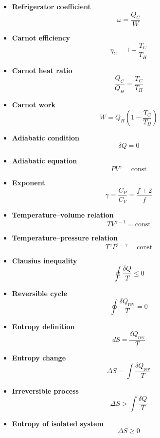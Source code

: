 \documentclass[9pt,twocoloumn]{article}
\begin{document}
\begin{itemize}
\item \textbf{Refrigerator coefficient}
\[
\omega = \frac{Q_C}{W}
\]

\item \textbf{Carnot efficiency}
\[
\eta_C = 1 - \frac{T_C}{T_H}
\]

\item \textbf{Carnot heat ratio}
\[
\frac{Q_C}{Q_H} = \frac{T_C}{T_H}
\]

\item \textbf{Carnot work}
\[
W = Q_H\left(1 - \frac{T_C}{T_H}\right)
\]

\item \textbf{Adiabatic condition}
\[
\delta Q = 0
\]

\item \textbf{Adiabatic equation}
\[
PV^\gamma = \text{const}
\]

\item \textbf{Exponent}
\[
\gamma = \frac{C_P}{C_V} = \frac{f+2}{f}
\]

\item \textbf{Temperature--volume relation}
\[
TV^{\gamma-1} = \text{const}
\]

\item \textbf{Temperature--pressure relation}
\[
T^\gamma P^{1-\gamma} = \text{const}
\]

\item \textbf{Clausius inequality}
\[
\oint \frac{\delta Q}{T} \le 0
\]

\item \textbf{Reversible cycle}
\[
\oint \frac{\delta Q_{\text{rev}}}{T} = 0
\]

\item \textbf{Entropy definition}
\[
dS = \frac{\delta Q_{\text{rev}}}{T}
\]

\item \textbf{Entropy change}
\[
\Delta S = \int \frac{\delta Q_{\text{rev}}}{T}
\]

\item \textbf{Irreversible process}
\[
\Delta S > \int \frac{\delta Q}{T}
\]

\item \textbf{Entropy of isolated system}
\[
\Delta S \ge 0
\]


\end{itemize}
\end{document}
